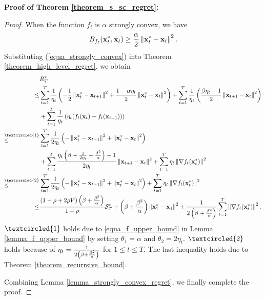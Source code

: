 \documentclass{article}
\begin{document}
\textbf{Proof of Theorem \ref{theorem_s_sc_regret}:}

\begin{proof}

When the function $f_t$ is $\alpha$ strongly convex, we have 
\begin{align}
\label{equa_strongly_convex}
B_{f_t}({\bf x}_t^{\ast}, {\bf x}_t) \ge \frac{\alpha}{2}\left\lVert{\bf x}_t^{\ast} - {\bf x}_t\right\rVert^2.
\end{align}  Substituting (\ref{equa_strongly_convex}) into Theorem \ref{theorem_high_level_regret}, we obtain 
\begin{align}
\nonumber
& R_T^{\ast} \\ \nonumber 
\le &  \sum\limits_{t=1}^{T} \frac{1}{\eta_t} \lrincir{  - \frac{1}{2} \lrnorm{\x_t^{\ast} - \x_{t+1}}^2   + \frac{1-\alpha\eta_t}{2} \lrnorm { \x_t^{\ast} - \x_t }^2 }   +  \sum\limits_{t=1}^{T} \frac{1}{\eta_t} \lrincir{ \frac{\beta\eta_t-1}{2} \lrnorm{\x_{t+1} - \x_t}^2 } \\ \nonumber 
& + \sum\limits_{t=1}^{T} \frac{1}{\eta_t} \lrincir{\eta_t(f_t(\x_t) - f_t(\x_{t+1})) } \\ \nonumber
\refabovecir{\le}{\textcircled{1}} & \sum\limits_{t=1}^{T} \frac{1}{2\eta_t} \lrincir{ -  \lrnorm{\x_t^{\ast} - \x_{t+1}}^2   + \lrnorm { \x_t^{\ast} - \x_t }^2 } \\ \nonumber
& + \sum\limits_{t=1}^{T} \frac{\eta_t\left(\beta+\frac{1}{2\eta_t} + \frac{\beta^2}{\alpha}\right)-1}{2\eta_t} \lrnorm{\x_{t+1} - \x_t}^2   + \sum\limits_{t=1}^{T}  \eta_t \lrnorm{\nabla f_t(\x_t^{\ast})}^2  \\ \nonumber
\refabovecir{\le}{\textcircled{2}} & \sum\limits_{t=1}^{T} \frac{1}{2\eta_t} \lrincir{  -  \lrnorm{\x_t^{\ast} - \x_{t+1}}^2   + \lrnorm { \x_t^{\ast} - \x_t }^2 }  +  \sum\limits_{t=1}^{T}\eta_t\lrnorm{\nabla f_t(\x_t^{\ast})}^2  \\ \nonumber
\le &  \frac{(1-\rho + 2\rho V)\lrincir{ \beta + \frac{\beta^2}{\alpha} }}{1-\rho} \Scal_T^{\ast} + \lrincir{ \beta + \frac{\beta^2}{\alpha} }\lrnorm{\x_1^{\ast} - \x_1}^2   + \frac{1}{ 2\lrincir{ \beta + \frac{\beta^2}{\alpha} } }\sum\limits_{t=1}^{T} \lrnorm{\nabla f_t(\x_t^{\ast})}^2. 
\end{align} $\textcircled{1}$ holds due to \eqref{equa_f_upper_bound} in Lemma \ref{lemma_f_upper_bound} by setting $\theta_1 = \alpha$ and $\theta_2 = 2\eta_t$. $\textcircled{2}$ holds because of $\eta_t = \frac{1}{2\left( \beta+\frac{\beta^2}{\alpha} \right)}$ for $1\le t\le T$.  The last inequality holds due to Theorem \ref{theorem_recurrsive_bound}. 

Combining Lemma \ref{lemma_strongly_convex_regret}, we finally complete the proof.

\end{proof}
\end{document}
